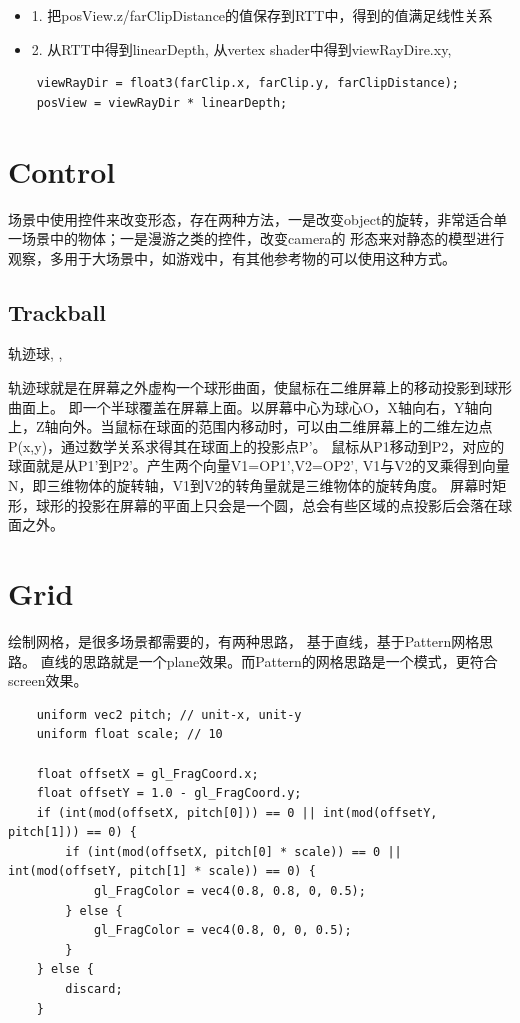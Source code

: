 \begin{itemize}
    \item {1. 把posView.z/farClipDistance的值保存到RTT中，得到的值满足线性关系}
    \item {2. 从RTT中得到linearDepth, 从vertex shader中得到viewRayDire.xy, }
\end{itemize}

\begin{lstlisting}
    viewRayDir = float3(farClip.x, farClip.y, farClipDistance);
    posView = viewRayDir * linearDepth;
\end{lstlisting}

\section{Control}

场景中使用控件来改变形态，存在两种方法，一是改变object的旋转，非常适合单一场景中的物体；一是漫游之类的控件，改变camera的
形态来对静态的模型进行观察，多用于大场景中，如游戏中，有其他参考物的可以使用这种方式。

\subsection{Trackball}

轨迹球\cite{Trackball}, \cite{VirtualTrackballsRevisited}, \cite{CmpArcBall}

轨迹球就是在屏幕之外虚构一个球形曲面，使鼠标在二维屏幕上的移动投影到球形曲面上。
即一个半球覆盖在屏幕上面。以屏幕中心为球心O，X轴向右，Y轴向上，Z轴向外。当鼠标在球面的范围内移动时，可以由二维屏幕上的二维左边点P(x,y)，通过数学关系求得其在球面上的投影点P'。
鼠标从P1移动到P2，对应的球面就是从P1'到P2'。产生两个向量V1=OP1',V2=OP2',  
V1与V2的叉乘得到向量N，即三维物体的旋转轴，V1到V2的转角量就是三维物体的旋转角度。
屏幕时矩形，球形的投影在屏幕的平面上只会是一个圆，总会有些区域的点投影后会落在球面之外。


\section{Grid}
绘制网格，是很多场景都需要的，有两种思路， 基于直线，基于Pattern网格思路。
直线的思路就是一个plane效果。而Pattern的网格思路是一个模式，更符合screen效果。
\begin{lstlisting}
    uniform vec2 pitch; // unit-x, unit-y
    uniform float scale; // 10

    float offsetX = gl_FragCoord.x;
    float offsetY = 1.0 - gl_FragCoord.y;
    if (int(mod(offsetX, pitch[0])) == 0 || int(mod(offsetY, pitch[1])) == 0) {
        if (int(mod(offsetX, pitch[0] * scale)) == 0 || int(mod(offsetY, pitch[1] * scale)) == 0) {
            gl_FragColor = vec4(0.8, 0.8, 0, 0.5);
        } else {
            gl_FragColor = vec4(0.8, 0, 0, 0.5);
        }
    } else {
        discard;
    }
\end{lstlisting}

